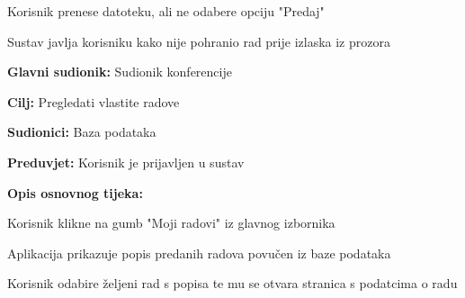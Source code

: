 \begin{packed_item}
\begin{packed_item}
							\item[5.a]  Korisnik prenese datoteku, ali ne odabere opciju "Predaj"
							\item[] \begin{packed_enum}
								
								\item Sustav javlja korisniku kako nije pohranio rad prije izlaska iz prozora
								
							\end{packed_enum}
							
						\end{packed_item}
					
					\end{packed_item}
					
					\noindent {}
					\begin{packed_item}
						
						\item \textbf{Glavni sudionik: } Sudionik konferencije
						\item  \textbf{Cilj:} Pregledati vlastite radove
						\item  \textbf{Sudionici:} Baza podataka
						\item  \textbf{Preduvjet:} Korisnik je prijavljen u sustav
						\item  \textbf{Opis osnovnog tijeka:}
						
						\item[] \begin{packed_enum}
							
							\item Korisnik klikne na gumb "Moji radovi" iz glavnog izbornika
							\item Aplikacija prikazuje popis predanih radova povučen iz baze podataka
							\item Korisnik odabire željeni rad s popisa te mu se otvara stranica s podatcima o radu
					
						\end{packed_enum}                
						
					\end{packed_item}
						\noindent {}

